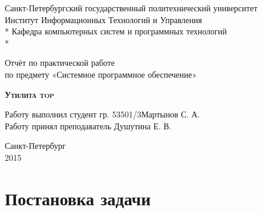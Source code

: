 \documentclass[a4paper, 12pt]{article}		%
\begin{document}
\nocite{*}

\begin{titlepage}
\thispagestyle{empty}

\begin{center}
Санкт-Петербургский государственный политехнический университет \\
Институт Информационных Технологий и Управления \\*
Кафедра компьютерных систем и программных технологий \\*
\hrulefill
\end{center}

\vspace{18em}

\begin{center}
\Large Отчёт по практической работе\\ по предмету «Системное программное обеспечение» \\
\end{center}

\vspace{1em}

\begin{center}
\textsc{\textbf{Утилита top}}
\end{center}

\vspace{16em}

\begin{flushleft}
Работу выполнил студент гр. 53501/3\hrulefill Мартынов С. А. \\
\vspace{1.5em}
Работу принял преподаватель \hrulefill Душутина Е. В. \\
\end{flushleft}

\vspace{\fill}

\begin{center}
Санкт-Петербург \\
2015
\end{center}

\end{titlepage}
\setcounter{page}{2}
\tableofcontents
\newpage
\section*{Постановка задачи}
\end{document}
